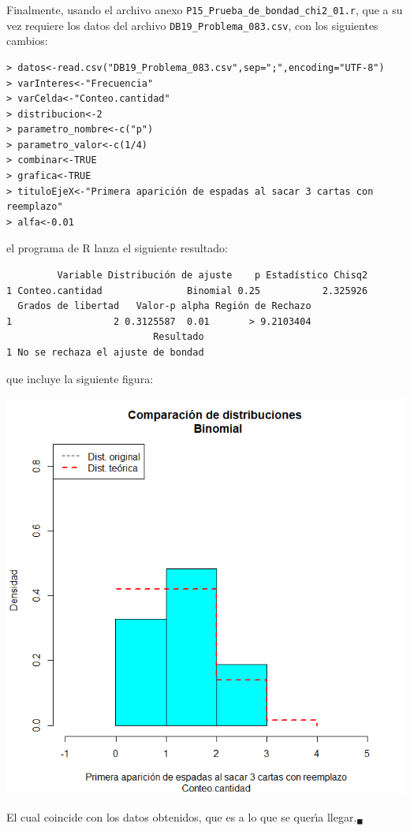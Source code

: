 \begin{solucion}
 Finalmente, usando el archivo anexo
 \texttt{P15\_Prueba\_de\_bondad\_chi2\_01.r},
 que a su vez requiere los datos del archivo
 \texttt{DB19\_Problema\_083.csv}, con los siguientes cambios:
 \begin{verbatim}
> datos<-read.csv("DB19_Problema_083.csv",sep=";",encoding="UTF-8")
> varInteres<-"Frecuencia"
> varCelda<-"Conteo.cantidad"
> distribucion<-2
> parametro_nombre<-c("p")
> parametro_valor<-c(1/4)
> combinar<-TRUE
> grafica<-TRUE
> tituloEjeX<-"Primera aparición de espadas al sacar 3 cartas con reemplazo"
> alfa<-0.01
 \end{verbatim}
 \vspace{-0.5cm}
 el programa de R lanza el siguiente resultado:
 \begin{verbatim}
         Variable Distribución de ajuste    p Estadístico Chisq2
1 Conteo.cantidad               Binomial 0.25           2.325926
  Grados de libertad   Valor-p alpha Región de Rechazo
1                  2 0.3125587  0.01       > 9.2103404
                          Resultado
1 No se rechaza el ajuste de bondad
 \end{verbatim}
 \vspace{-0.5cm}
 que incluye la siguiente figura:
 \begin{center}
  \includegraphics[scale=0.35]{Problema_83.png}
 \end{center}
 El cual coincide con los datos obtenidos,
 que es a lo que se quer\'{\i}a llegar.${}_{\blacksquare}$
\end{solucion}
